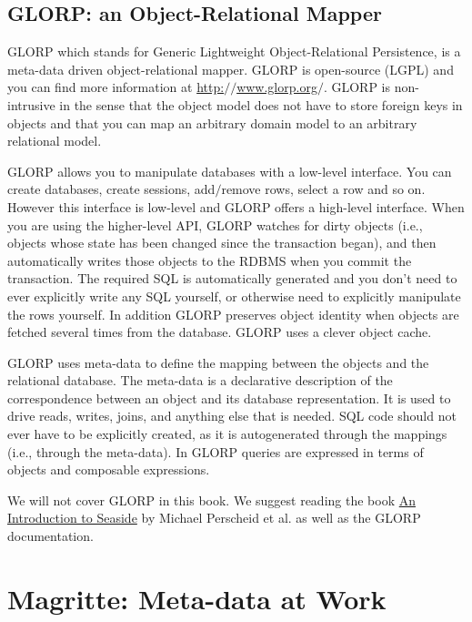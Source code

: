 \documentclass[a4paper,10pt,twoside]{book}
\begin{document}
\section{GLORP: an Object-Relational Mapper}
\label{book:advanced:persistency:glorp}

GLORP which stands for Generic Lightweight Object-Relational Persistence, is a meta-data driven object-relational mapper. GLORP is open-source (LGPL) and you can find more information at \href{http://www.glorp.org/}{http:$/$$/$www.glorp.org$/$}. GLORP is non-intrusive in the sense that the object model does not have to store foreign keys in objects and that you can map an arbitrary domain model to an arbitrary relational model.

GLORP allows you to manipulate databases with a low-level interface. You can create databases, create sessions, add$/$remove rows, select a row and so on. However this interface is low-level and GLORP offers a high-level interface. When you are using the higher-level API, GLORP watches for dirty objects (i.e., objects whose state has been changed since the transaction began), and then automatically writes those objects to the RDBMS when you commit the transaction. The required SQL is automatically generated and you don't need to ever explicitly write any SQL yourself, or otherwise need to explicitly manipulate the rows yourself. In addition GLORP preserves object identity when objects are fetched several times from the database. GLORP uses a clever object cache.

GLORP uses meta-data to define the mapping between the objects and the relational database. The meta-data is a declarative description of the correspondence between an object and its database representation. It is used to drive reads, writes, joins, and anything else that is needed. SQL code should not ever have to be explicitly created, as it is autogenerated through the mappings (i.e., through the meta-data). In GLORP queries are expressed in terms of objects and composable expressions.

We will not cover GLORP in this book. We suggest reading the book \href{http://www.swa.hpi.uni-potsdam.de/seaside/tutorial}{An Introduction to Seaside} by Michael Perscheid et al. as well as the GLORP documentation.

\chapter{Magritte: Meta-data at Work}
\label{book:advanced:magritte}
\end{document}
